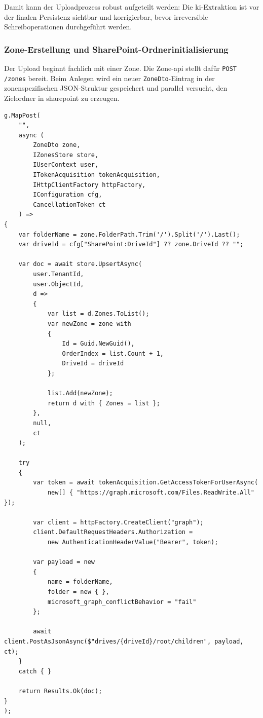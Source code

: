 Damit kann der Uploadprozess robust aufgeteilt werden: Die \gls{ki}-Extraktion ist vor der finalen Persistenz sichtbar und korrigierbar, bevor irreversible Schreiboperationen durchgeführt werden.

\subsubsection{Zone-Erstellung und SharePoint-Ordnerinitialisierung}

Der Upload beginnt fachlich mit einer Zone. Die Zone-\acrshort{api} stellt dafür \texttt{POST /zones} bereit. Beim Anlegen wird ein neuer \texttt{ZoneDto}-Eintrag in der zonenspezifischen JSON-Struktur gespeichert und parallel versucht, den Zielordner in \gls{sharepoint} zu erzeugen.

\begin{lstlisting}[language={[Sharp]C},caption={Zone-Erstellung mit SharePoint-Ordnerinitialisierung},label={lst:upload-zone-create}]
g.MapPost(
    "",
    async (
        ZoneDto zone,
        IZonesStore store,
        IUserContext user,
        ITokenAcquisition tokenAcquisition,
        IHttpClientFactory httpFactory,
        IConfiguration cfg,
        CancellationToken ct
    ) =>
{
    var folderName = zone.FolderPath.Trim('/').Split('/').Last();
    var driveId = cfg["SharePoint:DriveId"] ?? zone.DriveId ?? "";

    var doc = await store.UpsertAsync(
        user.TenantId,
        user.ObjectId,
        d =>
        {
            var list = d.Zones.ToList();
            var newZone = zone with
            {
                Id = Guid.NewGuid(),
                OrderIndex = list.Count + 1,
                DriveId = driveId
            };

            list.Add(newZone);
            return d with { Zones = list };
        },
        null,
        ct
    );

    try
    {
        var token = await tokenAcquisition.GetAccessTokenForUserAsync(
            new[] { "https://graph.microsoft.com/Files.ReadWrite.All" });

        var client = httpFactory.CreateClient("graph");
        client.DefaultRequestHeaders.Authorization =
            new AuthenticationHeaderValue("Bearer", token);

        var payload = new
        {
            name = folderName,
            folder = new { },
            microsoft_graph_conflictBehavior = "fail"
        };

        await client.PostAsJsonAsync($"drives/{driveId}/root/children", payload, ct);
    }
    catch { }

    return Results.Ok(doc);
}
);
\end{lstlisting}


